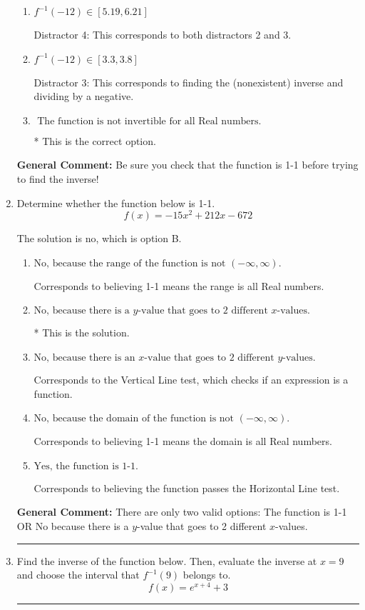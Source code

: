 \documentclass{extbook}[14pt]
\newcommand{\litem}[1]{\item #1

\rule{\textwidth}{0.4pt}}
\begin{document}
\begin{enumerate}
{\begin{enumerate}[label=\Alph*.]
 Distractor 2: This corresponds to finding the (nonexistent) inverse and not subtracting by the vertical shift.
\item \( f^{-1}(-12) \in [5.19, 6.21] \)

 Distractor 4: This corresponds to both distractors 2 and 3.
\item \( f^{-1}(-12) \in [3.3, 3.8] \)

 Distractor 3: This corresponds to finding the (nonexistent) inverse and dividing by a negative.
\item \( \text{ The function is not invertible for all Real numbers. } \)

* This is the correct option.
\end{enumerate}

\textbf{General Comment:} Be sure you check that the function is 1-1 before trying to find the inverse!
}
\litem{
Determine whether the function below is 1-1.
\[ f(x) = -15 x^2 + 212 x - 672 \]

The solution is \( \text{no} \), which is option B.\begin{enumerate}[label=\Alph*.]
\item \( \text{No, because the range of the function is not $(-\infty, \infty)$.} \)

Corresponds to believing 1-1 means the range is all Real numbers.
\item \( \text{No, because there is a $y$-value that goes to 2 different $x$-values.} \)

* This is the solution.
\item \( \text{No, because there is an $x$-value that goes to 2 different $y$-values.} \)

Corresponds to the Vertical Line test, which checks if an expression is a function.
\item \( \text{No, because the domain of the function is not $(-\infty, \infty)$.} \)

Corresponds to believing 1-1 means the domain is all Real numbers.
\item \( \text{Yes, the function is 1-1.} \)

Corresponds to believing the function passes the Horizontal Line test.
\end{enumerate}

\textbf{General Comment:} There are only two valid options: The function is 1-1 OR No because there is a $y$-value that goes to 2 different $x$-values.
}
\litem{
Find the inverse of the function below. Then, evaluate the inverse at $x = 9$ and choose the interval that $f^{-1}(9)$ belongs to.
\[ f(x) = e^{x+4}+3 \]

}
\end{enumerate}
\end{document}
